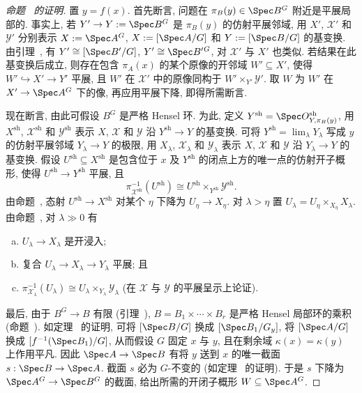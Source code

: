 \begin{proof}[命题~ 的证明]
置 $y=f(x)$. 首先断言, 问题在 $\pi_B(y)\in\Spec B^G$ 附近是平展局部的. 事实上, 若 $Y'\to Y:=\Spec B^G$ 是 $\pi_B(y)$ 的仿射平展邻域, 用 $X'$, $\mathcal X'$ 和 $\mathcal Y'$ 分别表示 $X:=\Spec A^G$, $\mathcal X:=[\Spec A/G]$ 和 $\mathcal Y:=[\Spec B/G]$ 的基变换. 由引理~, 有 $\mathcal Y'\cong[\Spec B'/G]$, $Y'\cong\Spec B'{}^G$, 对 $\mathcal X'$ 与 $X'$ 也类似. 若结果在此基变换后成立, 则存在包含 $\pi_A(x)$ 的某个原像的开邻域 $W'\subseteq X'$, 使得 $W'\hookrightarrow X'\to Y'$ 平展, 且 $W'$ 在 $\mathcal X'$ 中的原像同构于 $W'\times_{Y'}\mathcal Y'$. 取 $W$ 为 $W'$ 在 $X'\to\Spec A^G$ 下的像, 再应用平展下降, 即得所需断言.

现在断言, 由此可假设 $B^G$ 是严格 Hensel 环. 为此, 定义 $Y^{\mathrm{sh}}=\Spec\mathcal O^{\mathrm{sh}}_{Y,\pi_B(y)}$, 用 $X^{\mathrm{sh}}$, $\mathcal X^{\mathrm{sh}}$ 和 $\mathcal Y^{\mathrm{sh}}$ 表示 $X$, $\mathcal X$ 和 $\mathcal Y$ 沿 $Y^{\mathrm{sh}}\to Y$ 的基变换. 可将 $Y^{\mathrm{sh}}=\lim_\lambda Y_\lambda$ 写成 $y$ 的仿射平展邻域 $Y_\lambda\to Y$ 的极限, 用 $X_\lambda$, $\mathcal X_\lambda$ 和 $\mathcal Y_\lambda$ 表示 $X$, $\mathcal X$ 和 $\mathcal Y$ 沿 $Y_\lambda\to Y$ 的基变换. 假设 $U^{\mathrm{sh}}\subseteq X^{\mathrm{sh}}$ 是包含位于 $x$ 及 $Y^{\mathrm{sh}}$ 的闭点上方的唯一点的仿射开子概形, 使得 $U^{\mathrm{sh}}\to Y^{\mathrm{sh}}$ 平展, 且
\[
\pi_{\mathcal X^{\mathrm{sh}}}^{-1}(U^{\mathrm{sh}})\cong U^{\mathrm{sh}}\times_{Y^{\mathrm{sh}}}\mathcal Y^{\mathrm{sh}}.
\]
由命题~, 态射 $U^{\mathrm{sh}}\to X^{\mathrm{sh}}$ 对某个 $\eta$ 下降为 $U_\eta\to X_\eta$. 对 $\lambda>\eta$ 置 $U_\lambda=U_\eta\times_{X_\eta}X_\lambda$. 由命题~, 对 $\lambda\gg0$ 有
\begin{enumerate}[(a)]
\item $U_\lambda\to X_\lambda$ 是开浸入;
\item 复合 $U_\lambda\to X_\lambda\to Y_\lambda$ 平展; 且
\item $\pi_{\mathcal X_\lambda}^{-1}(U_\lambda)\cong U_\lambda\times_{Y_\lambda}\mathcal Y_\lambda$ (在 $\mathcal X$ 与 $\mathcal Y$ 的平展呈示上论证).
\end{enumerate}
最后, 由于 $B^G\to B$ 有限 (引理~), $B=B_1\times\cdots\times B_r$ 是严格 Hensel 局部环的乘积 (命题~). 如定理~ 的证明, 可将 $[\Spec B/G]$ 换成 $[\Spec B_1/G_y]$, 将 $[\Spec A/G]$ 换成 $[f^{-1}(\Spec B_1)/G]$, 从而假设 $G$ 固定 $x$ 与 $y$, 且在剩余域 $\kappa(x)=\kappa(y)$ 上作用平凡. 因此 $\Spec A\to\Spec B$ 有将 $y$ 送到 $x$ 的唯一截面 $s:\Spec B\to\Spec A$. 截面 $s$ 必为 $G$-不变的 (如定理~ 的证明). 于是 $s$ 下降为 $\Spec A^G\to\Spec B^G$ 的截面, 给出所需的开闭子概形 $W\subseteq\Spec A^G$.
\end{proof}
